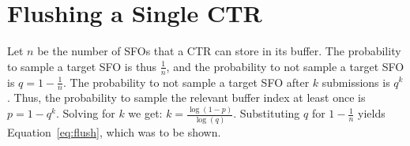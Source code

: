 \section{Flushing a Single CTR} \label{app:flush}
Let $n$ be the number of SFOs that a CTR can store in its buffer.  The
probability to sample a target SFO is thus $\frac{1}{n}$, and the probability to
not sample a target SFO is $q = 1 - \frac{1}{n}$.  The probability to not sample
a target SFO after $k$ submissions is $q^k$.  Thus, the probability to sample
the relevant buffer index at least once is $p = 1 - q^k$.  Solving for $k$ we
get: $k = \frac{\log(1 - p)}{\log(q)}$.  Substituting $q$ for $1 - \frac{1}{n}$
yields Equation~\ref{eq:flush}, which was to be shown.
